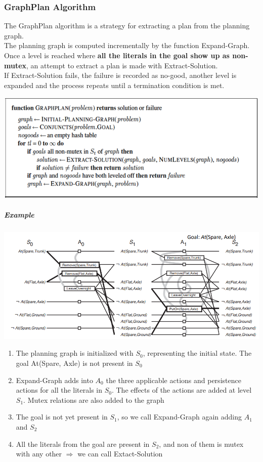 \documentclass[10pt]{report}
\begin{document}
\subsubsection{GraphPlan Algorithm}
The GraphPlan algorithm is a strategy for extracting a plan from the planning graph.\\
The planning graph is computed incrementally by the function Expand-Graph. Once a level is reached where \textbf{all the literals in the goal show up as non-mutex}, an attempt to extract a plan is made with Extract-Solution.\\
If Extract-Solution fails, the failure is recorded as no-good, another level is expanded and the process repeats until a termination condition is met.
\begin{center}
	\includegraphics[scale=0.7]{26.png}
\end{center}
\subparagraph{Example}
\begin{center}
	\includegraphics[scale=0.7]{27.png}
\end{center}
\begin{enumerate}
	\item The planning graph is initialized with $S_0$, representing the initial state. The goal At(Spare, Axle) is not present in $S_0$
	\item Expand-Graph adds into $A_0$ the three applicable actions and persistence actions for all the literals in $S_0$. The effects of the actions are added at level $S_1$. Mutex relations are also added to the graph
	\item The goal is not yet present in $S_1$, so we call Expand-Graph again adding $A_1$ and $S_2$
	\item All the literals from the goal are present in $S_2$, and non of them is mutex with any other $\Rightarrow$ we can call Extact-Solution
\end{enumerate}
\end{document}
